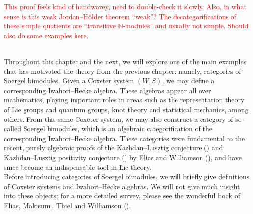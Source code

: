 \noindent\textcolor{red}{This proof feels kind of handwavey, need to double-check it slowly. Also, in what sense is this weak Jordan--H\"{o}lder theorem ``weak''? The decategorifications of these simple quotients are ``transitive $\mathbb{N}$-modules'' and usually not simple. Should also do some examples here.}\\
\newpage

\noindent\\ Throughout this chapter and the next, we will explore one of the main examples that has motivated the theory from the previous chapter: namely, categories of Soergel bimodules. %
Given a Coxeter system $(W, S)$, we may define a corresponding Iwahori--Hecke algebra. These algebras appear all over mathematics, playing important roles in areas such as the representation theory of Lie groups and quantum groups, knot theory and statistical mechanics, among others. From this same Coxeter system, we may also construct a category of so-called Soergel bimodules, which is an algebraic categorification of the corresponding Iwahori--Hecke algebra. These categories were fundamental to the recent, purely algebraic proofs of the Kazhdan--Lusztig conjecture (\cite[Conjecture 1.5]{KL79}) and Kazhdan--Lusztig positivity conjecture (\cite[p.\ 166]{KL79}) by Elias and Williamson (\cite[Theorem 1.1 and Corollary 1.2, respectively]{EW14}), and have since become an indispensable tool in Lie theory.\\

\noindent Before introducing categories of Soergel bimodules, we will briefly give definitions of Coxeter systems and Iwahori--Hecke algebras. We will not give much insight into these objects; for a more detailed survey, please see the wonderful book of Elias, Makisumi, Thiel and Williamson (\cite{EMTW20}).\\


